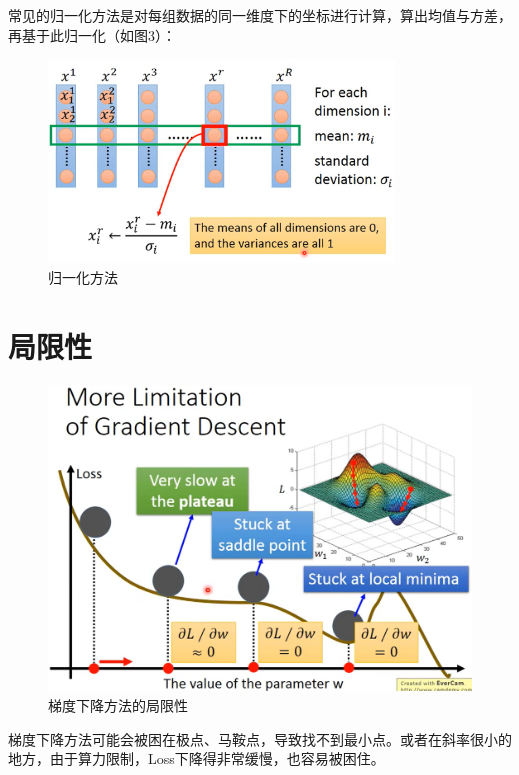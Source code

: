 \documentclass[UTF8,a4paper]{article}
\begin{document}
常见的归一化方法是对每组数据的同一维度下的坐标进行计算，算出均值与方差，再基于此归一化（如图3）：

\begin{figure}[ht]
\centering
\includegraphics[width=260pt]{scalingMethod.png}
\caption{归一化方法}
\label{scalingMethod}
\end{figure}

\newpage

\section{局限性}

\begin{figure}[ht]
\centering
\includegraphics[width=340pt]{limitation.png}
\caption{梯度下降方法的局限性}
\label{limitation}
\end{figure}

梯度下降方法可能会被困在极点、马鞍点，导致找不到最小点。或者在斜率很小的地方，由于算力限制，Loss下降得非常缓慢，也容易被困住。
\end{document}
